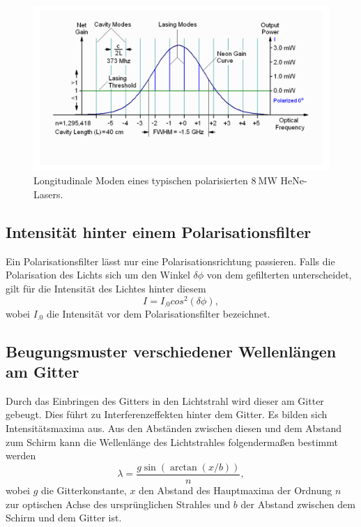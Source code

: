 \begin{figure}
	\centering
	\includegraphics[width=\linewidth-50pt,height=\textheight-100pt,keepaspectratio]{content/images/multimode2.pdf}
	\caption{Longitudinale Moden eines typischen polarisierten $\SI{8}{\mega\watt}$ HeNe-Lasers.}
	\label{fig:doppler}
\end{figure}

\subsection{Intensität hinter einem Polarisationsfilter}
Ein Polarisationsfilter lässt nur eine Polarisationsrichtung passieren. Falls die Polarisation des Lichts sich um den Winkel $\delta\phi$ von dem gefilterten unterscheidet, gilt für die Intensität des Lichtes hinter diesem
\begin{equation}
	I=I_.0 cos^2(\delta\phi), \label{eq:polar}
\end{equation}
wobei $I_.0$ die Intensität vor dem Polarisationsfilter bezeichnet.


\subsection{Beugungsmuster verschiedener Wellenlängen am Gitter}
Durch das Einbringen des Gitters in den Lichtstrahl wird dieser am Gitter gebeugt. Dies führt zu Interferenzeffekten hinter dem Gitter. Es bilden sich Intensitätsmaxima aus. Aus den Abständen zwischen diesen und dem Abstand zum Schirm kann die Wellenlänge des Lichtstrahles folgendermaßen bestimmt werden
\begin{equation}
	\lambda = \frac{g \sin(\arctan(x/b))}{n}, \label{eq:lambda}
\end{equation}
wobei $g$ die Gitterkonstante, $x$ den Abstand des Hauptmaxima der Ordnung $n$ zur optischen Achse des ursprünglichen Strahles und $b$ der Abstand zwischen dem Schirm und dem Gitter ist.


